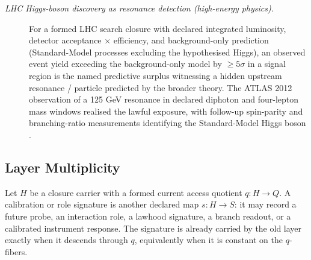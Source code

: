 \documentclass[11pt]{article}
\theoremstyle{definition}
\begin{document}
\begin{description}
\item[\emph{{LHC} Higgs-boson discovery as resonance detection
(high-energy physics).}]
For a formed LHC search closure with declared integrated luminosity,
detector acceptance \(\times\) efficiency, and background-only
prediction (Standard-Model processes excluding the hypothesised
Higgs), an observed event yield exceeding the background-only model
by \(\ge 5\sigma\) in a signal region is the named predictive
surplus witnessing a hidden upstream resonance / particle predicted
by the broader theory.  The ATLAS 2012 observation of a 125 GeV
resonance in declared diphoton and four-lepton mass windows realised
the lawful exposure, with follow-up spin-parity and branching-ratio
measurements identifying the Standard-Model Higgs boson
\citep{ATLAS2012HiggsObservation}.
\end{description}

\subsection{Layer Multiplicity}\label{sec:access:layer-multiplicity}

Let \(H\) be a closure carrier with a formed current access quotient
\(q:H\to Q\).  A calibration or role signature is another declared
map \(s:H\to S\): it may record a future probe, an interaction role,
a lawhood signature, a branch readout, or a calibrated instrument
response.  The signature is already carried by the old layer exactly
when it descends through \(q\), equivalently when it is constant on
the \(q\)-fibers.
\end{document}
